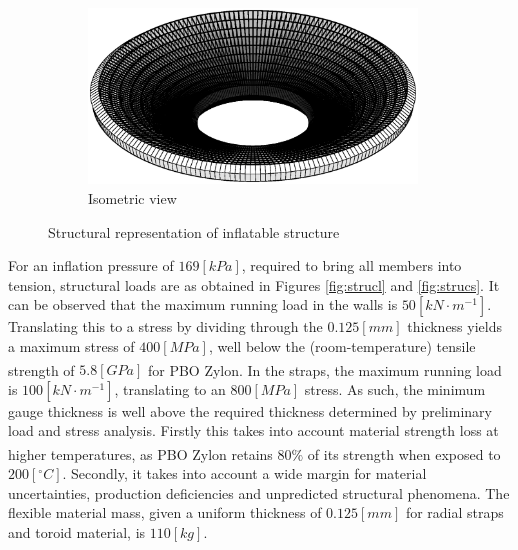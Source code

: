 \begin{figure}[h]
\begin{subfigure}[c]{0.5\textwidth}
		\includegraphics[width=0.96\textwidth]{./Figure/Structure/struc_rep.eps}
		\caption{Isometric view}
		\label{fig:iso}
	\end{subfigure}
\caption{Structural representation of inflatable structure}
\label{fig:strucreps}
\end{figure}

For an inflation pressure of $169 \left[kPa\right]$, required to bring all members into tension, structural loads are as obtained in Figures \ref{fig:strucl} and \ref{fig:strucs}. It can be observed that the maximum running load in the walls is $50 \left[kN \cdot m^{-1}\right]$. Translating this to a stress by dividing through the $0.125 \left[mm\right]$ thickness yields a maximum stress of $400 \left[MPa\right]$, well below the (room-temperature) tensile strength of $5.8 \left[GPa\right]$ for PBO Zylon\textsuperscript{\textregistered}. In the straps, the maximum running load is $100 \left[kN \cdot m^{-1}\right]$, translating to an $800 \left[MPa\right]$ stress. As such, the minimum gauge thickness is well above the required thickness determined by preliminary load and stress analysis. Firstly this takes into account material strength loss at higher temperatures, as PBO Zylon\textsuperscript{\textregistered} retains $80\%$ of its strength when exposed to $200 \left[^{\circ}C\right]$. Secondly, it takes into account a wide margin for material uncertainties, production deficiencies and unpredicted structural phenomena. The flexible material mass, given a uniform thickness of $0.125 \left[mm\right]$ for radial straps and toroid material, is $110 \left[kg\right]$.

